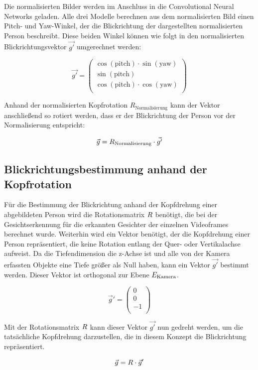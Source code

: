 Die normalisierten Bilder werden im Anschluss in die Convolutional Neural Networks geladen. Alle drei Modelle berechnen aus dem normalisierten Bild einen Pitch- und Yaw-Winkel, der die Blickrichtung der dargestellten normalisierten Person beschreibt. Diese beiden Winkel können wie folgt in den normalisierten Blickrichtungsvektor $\vec{g'}$ umgerechnet werden:

\[
 \vec{g'} = \begin{pmatrix}
     \cos(\text{pitch}) \cdot \sin(\text{yaw}) \\
    \sin(\text{pitch}) \\
     \cos(\text{pitch}) \cdot \cos(\text{yaw}) \\
 \end{pmatrix}
\]

Anhand der normalisierten Kopfrotation $R_\text{Normalisierung}$ kann der Vektor anschließend so rotiert werden, dass er der Blickrichtung der Person vor der Normalisierung entspricht:

\[
\vec{g} = R_{\text{Normalisierung}} \cdot \vec{g'}
\]

\subsection{Blickrichtungsbestimmung anhand der Kopfrotation}

Für die Bestimmung der Blickrichtung anhand der Kopfdrehung einer abgebildeten Person wird die Rotationsmatrix $R$ benötigt, die bei der Gesichtserkennung für die erkannten Gesichter der einzelnen Videoframes berechnet wurde. Weiterhin wird ein Vektor benötigt, der die Kopfdrehung einer Person repräsentiert, die keine Rotation entlang der Quer- oder Vertikalachse aufweist. Da die Tiefendimension die z-Achse ist und alle von der Kamera erfassten Objekte eine Tiefe größer als Null haben, kann ein Vektor $\vec{g'}$ bestimmt werden. Dieser Vektor ist orthogonal zur Ebene $E_{\text{Kamera}}$.

\[
\vec{g}' = \begin{pmatrix}
    0 \\ 0 \\ -1 \\
\end{pmatrix}
\]

Mit der Rotationsmatrix $R$ kann dieser Vektor $\vec{g'}$ nun gedreht werden, um die tatsächliche Kopfdrehung darzustellen, die in diesem Konzept die Blickrichtung repräsentiert.

\[
\vec{g} = R \cdot \vec{g}'
\]


